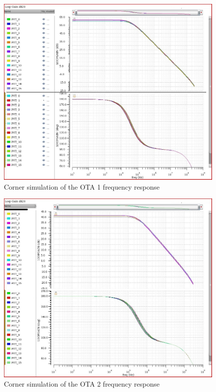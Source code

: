 \begin{figure}[H]
\centering
\includegraphics[width=\textwidth]{images/corner_gbw_phase_1.jpg}
\caption{Corner simulation of the OTA 1 frequency response}
\label{corner_freq_1}
\end{figure}

\begin{figure}[H]
\centering
\includegraphics[width=\textwidth]{images/corner_gbw_phase_2.jpg}
\caption{Corner simulation of the OTA 2 frequency response}
\label{corner_freq_2}
\end{figure}


